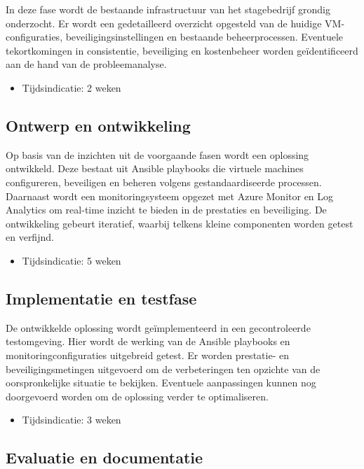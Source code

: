 In deze fase wordt de bestaande infrastructuur van het stagebedrijf grondig onderzocht.
Er wordt een gedetailleerd overzicht opgesteld van de huidige VM-configuraties, beveiligingsinstellingen en bestaande beheerprocessen.
Eventuele tekortkomingen in consistentie, beveiliging en kostenbeheer worden geïdentificeerd aan de hand van de probleemanalyse.

\begin{itemize}
  \item Tijdsindicatie: 2 weken
\end{itemize}

\subsection{Ontwerp en ontwikkeling}%

Op basis van de inzichten uit de voorgaande fasen wordt een oplossing ontwikkeld. Deze bestaat uit Ansible playbooks die virtuele machines configureren, beveiligen en beheren volgens gestandaardiseerde processen.
Daarnaast wordt een monitoringsysteem opgezet met Azure Monitor en Log Analytics om real-time inzicht te bieden in de prestaties en beveiliging.
De ontwikkeling gebeurt iteratief, waarbij telkens kleine componenten worden getest en verfijnd.

\begin{itemize}
  \item Tijdsindicatie: 5 weken
\end{itemize}

\subsection{Implementatie en testfase}%

De ontwikkelde oplossing wordt geïmplementeerd in een gecontroleerde testomgeving. Hier wordt de werking van de Ansible playbooks en monitoringconfiguraties uitgebreid getest.
Er worden prestatie- en beveiligingsmetingen uitgevoerd om de verbeteringen ten opzichte van de oorspronkelijke situatie te bekijken.
Eventuele aanpassingen kunnen nog doorgevoerd worden om de oplossing verder te optimaliseren.

\begin{itemize}
  \item Tijdsindicatie: 3 weken
\end{itemize}

\subsection{Evaluatie en documentatie}%

